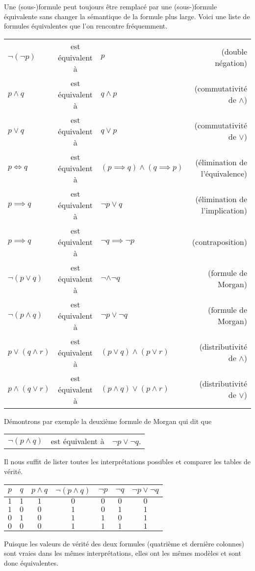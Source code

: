 Une (sous-)formule peut toujours être remplacé par une (sous-)formule équivalente sans changer la sémantique de la formule plus large. Voici une liste de formules équivalentes que l'on rencontre fréquemment.
\begin{center}
\begin{tabular}{lclr}
$\neg(\neg p)$&est équivalent à&$p$&(double négation) \\
$p\land q$&est équivalent à& $q\land p$&(commutativité de $\land$) \\
$p \lor q$&est équivalent à&$q \lor p$&(commutativité de $\lor$) \\
$p\Leftrightarrow q$&est équivalent à&$(p \implies q)\land (q \implies p)$&(élimination de l'équivalence) \\
$p \implies q$&est équivalent à&$\neg p \lor q$&(élimination de l'implication) \\
$p\implies q$&est équivalent à&$\neg q \implies \neg p$&(contraposition) \\
$\neg(p\lor q)$&est équivalent à&$\neg\land \neg q$& (formule de Morgan) \\
$\neg(p\land q)$&est équivalent à&$\neg p \lor \neg q$&(formule de Morgan) \\
$p\lor(q\land r)$&est équivalent à&$(p\lor q)\land (p\lor r)$& (distributivité de $\land$) \\
$p\land (q\lor r)$&est équivalent à&$(p\land q) \lor (p\land r)$&(distributivité de $\lor$) \\
\end{tabular}
\end{center}

Démontrons par exemple la deuxième formule de Morgan qui dit que
\begin{center}
\begin{tabular}{lcl}
$\neg(p\land q)$&est équivalent à&$\neg p \lor \neg q$. 
\end{tabular}
\end{center} 
Il nous suffit de lister toutes les interprétations possibles et comparer les tables de vérité. 

\begin{center}
\begin{tabular}{|c|c||c|c||c|c|c|}
\hline 
$p$&$q$&$p\land q$&$\neg(p\land q)$&$\neg p$&$\neg q$&$\neg p \lor \neg q$ \\ \hline \hline
$1$&$1$&$1$&$0$&$0$&$0$&$0$ \\ \hline 
$1$&$0$&$0$&$1$&$0$&$1$&$1$ \\ \hline 
$0$&$1$&$0$&$1$&$1$&$0$&$1$ \\ \hline 
$0$&$0$&$0$&$1$&$1$&$1$&$1$ \\ \hline 
\end{tabular}
\end{center}
Puisque les valeurs de vérité des deux formules (quatrième et dernière colonnes) sont vraies dans les mêmes interprétations, elles ont les mêmes modèles et sont donc équivalentes. 
